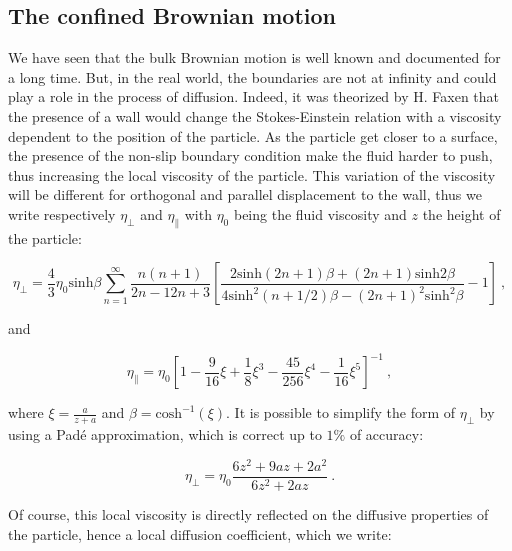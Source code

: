 \subsection{The confined Brownian motion}

We have seen that the bulk Brownian motion is well known and documented for a long time. But, in the real world, the boundaries are not at infinity and could play a role in the process of diffusion. Indeed, it was theorized by H. Faxen \cite{faxen_fredholm_1924} that the presence of a wall would change the Stokes-Einstein relation with a viscosity dependent to the position of the particle. As the particle get closer to a surface, the presence of the non-slip boundary condition make the fluid harder to push, thus increasing the local viscosity of the particle. This variation of the viscosity will be different for orthogonal and parallel displacement to the wall, thus we write respectively $\eta_\bot $ and $\eta_\parallel$ with $\eta_0$ being the fluid viscosity and $z$ the height of the particle:

\begin{equation}
	\eta_\bot = \frac{4}{3} \eta_0 \mathrm{sinh}\beta \sum _{n=1} ^{\infty} \frac{n(n+1)}{{2n-1}{2n+3}}
	\left[
	\frac
	{
		2\mathrm{sinh}(2n + 1)\beta + (2n +1)\mathrm{sinh}2\beta
	}
	{
		4\mathrm{sinh}^2(n + 1 /2)\beta  - (2n+1)^2 \mathrm{sinh}^2 \beta
	}
	-1
	\right] ~,
	\label{Eq:etaz}
\end{equation}

and 

\begin{equation}
	\eta_\parallel = \eta_0 
	\left[
		1 - \frac{9}{16} \xi + \frac{1}{8}\xi^3 - \frac{45}{256}\xi^4 - \frac{1}{16}\xi^5
	\right]^{-1}~,
	\label{Eq:etax}
\end{equation}

where $\xi = \frac{a}{z+a}$ and $\beta = \mathrm{cosh}^{-1}(\xi)$. It is possible to simplify the form of $\eta_\bot$ by using a Padé approximation, which is correct up to $1\%$ of accuracy:

\begin{equation}
	\eta_\bot = \eta_0 \frac{6z^2 + 9az + 2a^2}{6z^2 + 2az}~.
\end{equation}

Of course, this local viscosity is directly reflected on the diffusive properties of the particle, hence a local diffusion coefficient, which we write:

